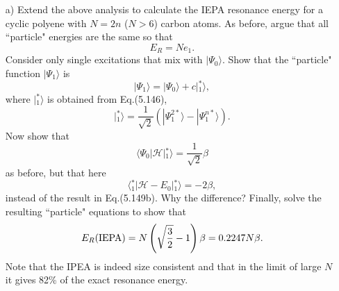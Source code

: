 \documentclass[a4paper]{book}
\newcounter{exercise}[chapter]
\begin{document}
	\begin{exercise}
	\begin{enumerate}
	
	\item[a)] Extend the above analysis to calculate the IEPA resonance energy for a cyclic polyene with $N=2n$ ($N>6$) carbon atoms. As before, argue that all ``particle" energies are the same so that
	\[
		E_R = N e_1.
	\]
	Consider only single excitations that mix with $| \Psi_0 \rangle$. Show that the ``particle" function $| \Psi_1 \rangle$ is
	\[
		| \Psi_1 \rangle = | \Psi_0 \rangle + c | {}^*_1 \rangle ,
	\]
	where $| {}^{*}_1 \rangle$ is obtained from Eq.(5.146),
	\[
		| {}^*_1 \rangle = \frac{1}{\sqrt{2}} \left( | \Psi^{2*}_1 \rangle - | \Psi^{n*}_1 \rangle \right).
	\]
	Now show that
	\[
		\langle \Psi_0 | \mathscr{H} | {}^*_1 \rangle = \frac{1}{\sqrt{2}} \beta
	\]
	as before, but that here
	\[
		\langle {}^*_1 | \mathscr{H} - E_0 | {}^*_1 \rangle = -2 \beta,
	\]
	instead of the result in Eq.(5.149b). Why the difference? Finally, solve the resulting ``particle" equations to show that
	\[
		E_R({\rm IEPA}) = N\left( \sqrt{ \frac{3}{2} } -1 \right) \beta = 0.2247 N \beta.
	\]
	Note that the IPEA is indeed size consistent and that in the limit of large $N$ it gives 82\% of the exact resonance energy.
	

\end{enumerate}
\end{exercise}
\end{document}
